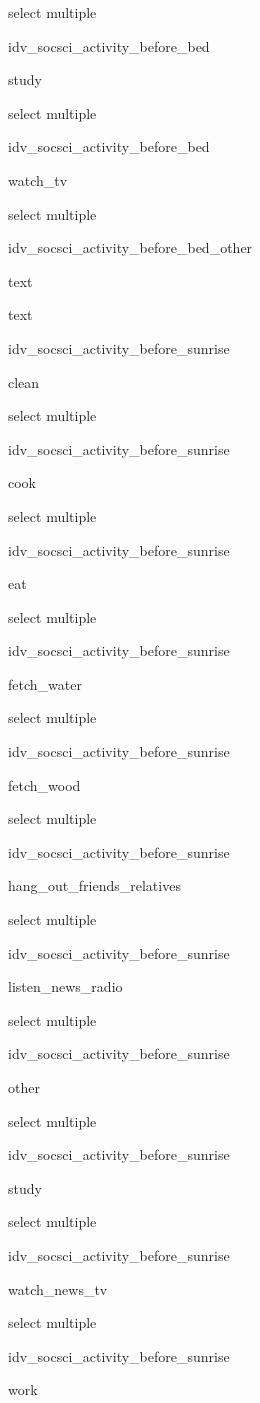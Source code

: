 \documentclass[]{article}
\begin{document}
select multiple

idv\_socsci\_activity\_before\_bed

study

select multiple

idv\_socsci\_activity\_before\_bed

watch\_tv

select multiple

idv\_socsci\_activity\_before\_bed\_other

text

text

idv\_socsci\_activity\_before\_sunrise

clean

select multiple

idv\_socsci\_activity\_before\_sunrise

cook

select multiple

idv\_socsci\_activity\_before\_sunrise

eat

select multiple

idv\_socsci\_activity\_before\_sunrise

fetch\_water

select multiple

idv\_socsci\_activity\_before\_sunrise

fetch\_wood

select multiple

idv\_socsci\_activity\_before\_sunrise

hang\_out\_friends\_relatives

select multiple

idv\_socsci\_activity\_before\_sunrise

listen\_news\_radio

select multiple

idv\_socsci\_activity\_before\_sunrise

other

select multiple

idv\_socsci\_activity\_before\_sunrise

study

select multiple

idv\_socsci\_activity\_before\_sunrise

watch\_news\_tv

select multiple

idv\_socsci\_activity\_before\_sunrise

work
\end{document}
